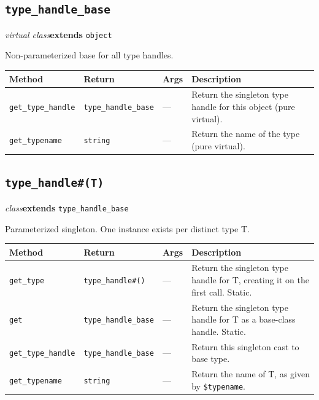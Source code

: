 \documentclass[11pt,letterpaper]{report}
\begin{document}
\subsection*{\texttt{type\_handle\_base}}
\noindent\small\textit{virtual class}\quad \textbf{extends} \texttt{object}\par

Non-parameterized base for all type handles.

\begin{xltabular}{\linewidth}{>{\small}p{1.35in} >{\small}p{1.25in} >{\small}p{0.95in} >{\small}X}
\toprule
\textbf{Method} & \textbf{Return} & \textbf{Args} & \textbf{Description} \\
\midrule
\endhead
\bottomrule
\endfoot
\texttt{get\_type\_handle} & \texttt{type\_handle\_base} & --- & Return the singleton type handle for this object (pure virtual). \\
\texttt{get\_typename} & \texttt{string} & --- & Return the name of the type (pure virtual). \\
\end{xltabular}

\subsection*{\texttt{type\_handle\#(T)}}
\noindent\small\textit{class}\quad \textbf{extends} \texttt{type\_handle\_base}\par

Parameterized singleton. One instance exists per distinct type T.

\begin{xltabular}{\linewidth}{>{\small}p{1.35in} >{\small}p{1.25in} >{\small}p{0.95in} >{\small}X}
\toprule
\textbf{Method} & \textbf{Return} & \textbf{Args} & \textbf{Description} \\
\midrule
\endhead
\bottomrule
\endfoot
\texttt{get\_type} & \texttt{type\_handle\#()} & --- & Return the singleton type handle for T, creating it on the first call. Static. \\
\texttt{get} & \texttt{type\_handle\_base} & --- & Return the singleton type handle for T as a base-class handle. Static. \\
\texttt{get\_type\_handle} & \texttt{type\_handle\_base} & --- & Return this singleton cast to base type. \\
\texttt{get\_typename} & \texttt{string} & --- & Return the name of T, as given by \texttt{\$typename}. \\
\end{xltabular}
\end{document}
